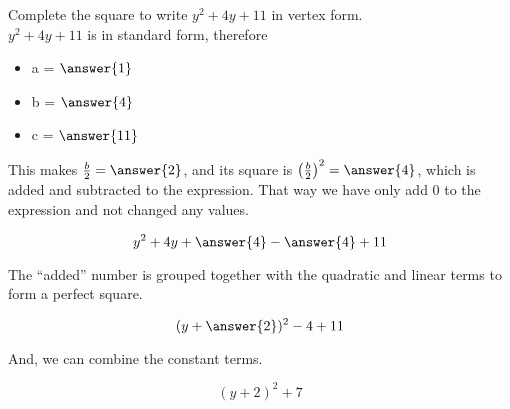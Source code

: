 \documentclass{ximera}
\author{Lee Wayand}
\begin{document}
\begin{exercise} 


Complete the square to write $y^2 + 4y + 11$ in vertex form. \\



$y^2 + 4y + 11$ is in standard form, therefore



\begin{itemize}
\item  a = $\answer{1}$ \\
\item  b = $\answer{4}$ \\
\item  c = $\answer{11}$ \\
\end{itemize}



This makes $\frac{b}{2} = \answer{2}$, and its square is $\left( \frac{b}{2} \right)^2 = \answer{4}$, which is added and subtracted to the expression.  That way we have only add $0$ to the expression and not changed any values. 


\[ y^2 + 4y + \answer{4} - \answer{4} + 11 \]



The ``added'' number is grouped together with the quadratic and linear terms to form a perfect square.



\[ ( y + \answer{2} )^2  - 4 + 11 \]

And, we can combine the constant terms.



\[  ( y + 2)^2  + 7 \]



\end{exercise}
\end{document}
